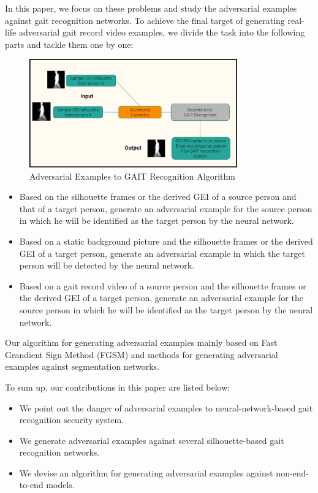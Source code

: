\documentclass[letterpaper]{article} %
\begin{document}
In this paper, we focus on these problems and study the adversarial examples against gait recognition networks. To achieve the final target of generating real-life adversarial gait record video examples, we divide the task into the following parts and tackle them one by one: 
\begin{figure}[t]
\centering
\includegraphics[width=0.8\textwidth]{dl4.png} 
\caption{Adversarial Examples to GAIT Recognition Algorithm}
\label{fig2}
\end{figure}
\begin{itemize}
\item Based on the silhouette frames or the derived GEI of a source person and that of a target person, generate an adversarial example for the source person in which he will be identified as the target person by the neural network.

\item Based on a static background picture and the silhouette frames or the derived GEI of a target person, generate an adversarial example in which the target person will be detected by the neural network.

\item Based on a gait record video of a source person and the silhouette frames or the derived GEI of a target person, generate an adversarial example for the source person in which he will be identified as the target person by the neural network.
\end{itemize}

Our algorithm for generating adversarial examples mainly based on Fast Grandient Sign Method (FGSM) and methods for generating adversarial examples against segmentation networks.

To sum up, our contributions in this paper are listed below:

\begin{itemize}
\item We point out the danger of adversarial examples to neural-network-based gait recognition security system.

\item We generate adversarial examples against several silhouette-based gait recognition networks.

\item We devise an algorithm for generating adversarial examples against non-end-to-end models.
\end{itemize}
\end{document}

